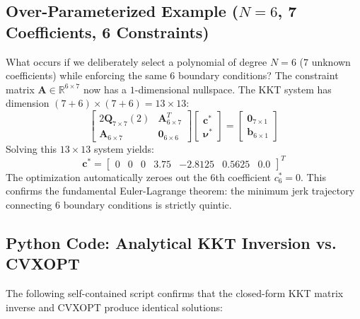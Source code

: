\documentclass[11pt,a4paper]{article}
\begin{document}
\subsection{Over-Parameterized Example (\texorpdfstring{$N=6$}{N=6}, 7 Coefficients, 6 Constraints)}

What occurs if we deliberately select a polynomial of degree $N=6$ ($7$ unknown coefficients) while enforcing the same $6$ boundary conditions?
The constraint matrix $\mathbf{A} \in \mathbb{R}^{6 \times 7}$ now has a $1$-dimensional nullspace. The KKT system has dimension $(7 + 6) \times (7 + 6) = 13 \times 13$:
\begin{equation}
\begin{bmatrix}
2\mathbf{Q}_{7 \times 7}(2) & \mathbf{A}_{6 \times 7}^T \\
\mathbf{A}_{6 \times 7} & \mathbf{0}_{6 \times 6}
\end{bmatrix}
\begin{bmatrix}
\mathbf{c}^* \\
\boldsymbol{\nu}^*
\end{bmatrix}
=
\begin{bmatrix}
\mathbf{0}_{7 \times 1} \\
\mathbf{b}_{6 \times 1}
\end{bmatrix}
\end{equation}
Solving this $13 \times 13$ system yields:
\begin{equation}
\mathbf{c}^* = \begin{bmatrix} 0 & 0 & 0 & 3.75 & -2.8125 & 0.5625 & \mathbf{0.0} \end{bmatrix}^T
\end{equation}
The optimization automatically zeroes out the 6th coefficient $c_6^* = 0$. This confirms the fundamental Euler-Lagrange theorem: the minimum jerk trajectory connecting 6 boundary conditions is strictly quintic.

\subsection{Python Code: Analytical KKT Inversion vs. CVXOPT}

The following self-contained script confirms that the closed-form KKT matrix inverse and CVXOPT produce identical solutions:
\end{document}
